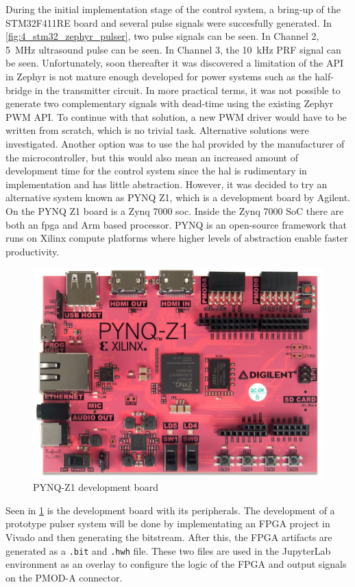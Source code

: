 During the initial implementation stage of the control system, a bring-up of the STM32F411RE board and several pulse signals were succesfully generated. In \cref{fig:4_stm32_zephyr_pulser}, two pulse signals can be seen. In Channel 2, \qty{5}{\mega\hertz} ultrasound pulse can be seen. In Channel 3, the \qty{10}{\kilo\hertz} PRF signal can be seen. Unfortunately, soon thereafter it was discovered a limitation of the API in Zephyr is not mature enough developed for power systems such as the half-bridge in the transmitter circuit. In more practical terms, it was not possible to generate two complementary signals with dead-time using the existing Zephyr PWM API. To continue with that solution, a new PWM driver would have to be written from scratch, which is no trivial task. Alternative solutions were investigated. Another option was to use the \gls{hal} provided by the manufacturer of the microcontroller, but this would also mean an increased amount of development time for the control system since the \gls{hal} is rudimentary in implementation and has little abstraction. However, it was decided to try an alternative system known as PYNQ Z1, which is a development board by Agilent. On the PYNQ Z1 board is a Zynq 7000 \gls{soc}. Inside the Zynq 7000 SoC there are both an \gls{fpga} and Arm based processor. PYNQ is an open-source framework that runs on Xilinx compute platforms where higher levels of abstraction enable faster productivity.

\begin{figure}[htbp]
	\centering
	\includegraphics[width=.8\textwidth]{Figures/4_pynq_z1_pcb_pic.png}
	\caption{PYNQ-Z1 development board}
	\label{fig:4_controlsystem_pynq_z1_pcb}
\end{figure}

Seen in \cref{fig:4_controlsystem_pynq_z1_pcb} is the development board with its peripherals. The development of a prototype pulser system will be done by implementating an FPGA project in Vivado and then generating the \gls{bitstream}. After this, the FPGA artifacts are generated as a \texttt{.bit} and \texttt{.hwh} file. These two files are used in the JupyterLab environment as an overlay to configure the logic of the FPGA and output signals on the PMOD-A connector.

